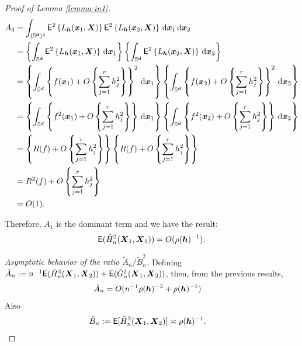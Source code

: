 \documentclass[oneside,11pt]{article}
\begin{document}
\begin{proof}[Proof of Lemma \ref{lemma-in1}]

\begin{align*}
    A_3 &= \int_{(\Sr)^2}\mathsf{E}^2\lrb{{L}_{\bh} (\bx_1,\bX)}\mathsf{E}^2\lrb{{L}_{\bh} (\bx_2,\bX)}\,\rd \bx_1 \,\rd \bx_2\\
    &= \lrb{\int_{\Sr}\mathsf{E}^2\lrb{{L}_{\bh} (\bx_1,\bX)} \,\rd \bx_1} \lrb{\int_{\Sr} \mathsf{E}^2\lrb{{L}_{\bh} (\bx_2,\bX)} \,\rd \bx_2} \\
    &= \lrb{\int_{\Sr} \lrb{f(\bx_1)+O\lrb{\sum_{j=1}^{r}h_j^2}}^2 \,\rd \bx_1} \lrb{\int_{\Sr}  \lrb{f(\bx_2)+O\lrb{\sum_{j=1}^{r}h_j^2}}^2 \,\rd \bx_2} \\
    &= \lrb{\int_{\Sr} \lrb{f^2(\bx_1)+O\lrb{\sum_{j=1}^{r}h_j^2}} \,\rd \bx_1} \lrb{\int_{\Sr}  \lrb{f^2(\bx_2)+O\lrb{\sum_{j=1}^{r}h_j^2}} \,\rd \bx_2} \\
    &= \lrb{R(f) + O\lrb{\sum_{j=1}^{r}h_j^2}} \lrb{R(f) + O\lrb{\sum_{j=1}^{r}h_j^2}} \\
    &= R^2(f) + O\lrb{\sum_{j=1}^{r}h_j^2} \\
    &= O(1).
\end{align*}


Therefore, $A_1$ is the dominant term and we have the result:
\begin{align*}
    \mathsf{E} ( \tilde{H}_n^2(\bX_1, \bX_2)) = O(\rho (\bh)^{-1}).
\end{align*}

\textit{Asymptotic behavior of the ratio $\tilde{A}_n / \tilde{B}_n^2$.} Defining $\tilde{A}_n \defin n^{-1} \mathsf{E} (\tilde{H}_n^4(\bX_1, \bX_2)) + \mathsf{E} (\tilde{G}_n^2(\bX_1,\bX_2))$, then, from the previous results,
\begin{align*}
    \tilde{A}_n &= O(n^{-1}\rho(\bh)^{-3} + \rho(\bh)^{-1})
\end{align*}
Also
\begin{align*}
    \tilde{B}_n &\defin \mathsf{E}[\tilde{H}_n^2(\bX_1,\bX_2)] \asymp \rho (\bh)^{-1}.
\end{align*}


\end{proof}
\end{document}
